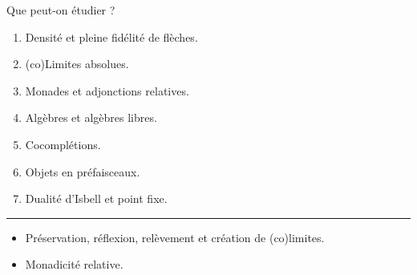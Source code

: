 \documentclass[9pt]{beamer}
\begin{document}
\begin{frame}{Que peut-on étudier ?}
    \begin{enumerate}
        \item Densité et pleine fidélité de flèches.
        \item (co)Limites absolues.
        \item Monades et adjonctions relatives.
        \item Algèbres et algèbres libres.
        \item Cocomplétions.
        \item Objets en préfaisceaux.
        \item Dualité d'Isbell et point fixe.
    \end{enumerate}
    \vspace{\baselineskip}
    \hrule
    \vspace{\baselineskip}
    \begin{itemize}
        \item Préservation, réflexion, relèvement et création de (co)limites.
        \item Monadicité relative.
    \end{itemize}
\end{frame}
\end{document}
